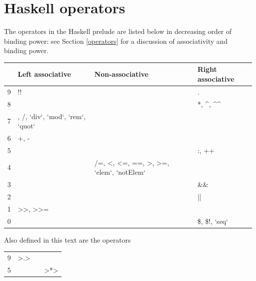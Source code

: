 

\chapter{Haskell operators}
\label{hsOps}
\normalfont\normalsize
The operators in the Haskell prelude are listed below in decreasing order of binding power:
see Section \ref{operators} for a discussion of associativity and binding power.

\begin{center}
{\begin{tabular}{p{.3in}p{1in}p{1.5in}p{1in}}
\\[-9pt]
 & Left associative & Non-associative & Right associative\\
\hline
9 & \ttfamily !! & & . \\
8 & & & \ttfamily **, \^{}, \^{}\^{}\\
7 & \ttfamily   *, /, `div`, `mod`, `rem`, `quot`& \\
6 & \ttfamily +, - & & \ttfamily \\
5 & \ttfamily &  & \ttfamily :, ++ \\
4 & & \ttfamily /=, <, <=, ==, >, >=, `elem`, `notElem` \\
3 & & & \ttfamily \&\& \\
2 & & & \ttfamily || \\
1 & \ttfamily >>, >>= \\
0 & & & \ttfamily \$, \$!, `seq` \\[3pt]
\end{tabular}}
\end{center}
\minx{**}\minx{\^{}}\minx{\^{}\^{}}
\minx{*}\minx{/}
\minx{+}\minx{-}
\minx{:}\minx{++}
\minx{/=}\minx{<}\minx{<=}\minx{==}\minx{>}\minx{>=}
\minx{\&\&}\minx{>>}\minx{\$}
\medskip
\noindent
Also defined in this text are the operators
\begin{center}
{\begin{tabular}{p{.3in}p{1in}p{1.5in}p{1in}}
\\[-9pt]
9 & \ttfamily  >.> \\ 
5 & & & \ttfamily >*> \\[3pt]
\end{tabular}}
\end{center}

